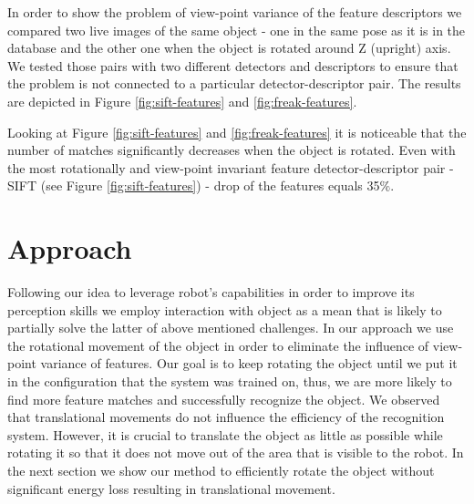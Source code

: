 In order to show the problem of view-point variance of the feature descriptors we compared two live images of the same object - one in the same pose as it is in the database and the other one when the object is rotated around Z (upright) axis. We tested those pairs with two different detectors and descriptors to ensure that the problem is not connected to a particular detector-descriptor pair. The results are depicted in Figure \ref{fig:sift-features} and \ref{fig:freak-features}.%

Looking at Figure \ref{fig:sift-features} and \ref{fig:freak-features} it is noticeable that the number of matches significantly decreases when the object is rotated. Even with the most rotationally and view-point invariant feature detector-descriptor pair - SIFT (see Figure \ref{fig:sift-features}) - drop of the features equals 35$\%$.



\section{Approach}

Following our idea to leverage robot's capabilities in order to improve its perception skills we employ interaction with object as a mean that is likely to partially solve the latter of above mentioned challenges. In our approach we use the rotational movement of the object in order to eliminate the influence of view-point variance of features. Our goal is to keep rotating the object until we put it in the configuration that the system was trained on, thus, we are more likely to find more feature matches and successfully recognize the object. We observed that translational movements do not influence the efficiency of the recognition system. However, it is crucial to translate the object as little as possible while rotating it so that it does not move out of the area that is visible to the robot. In the next section we show our method to efficiently rotate the object without significant energy loss resulting in translational movement.

